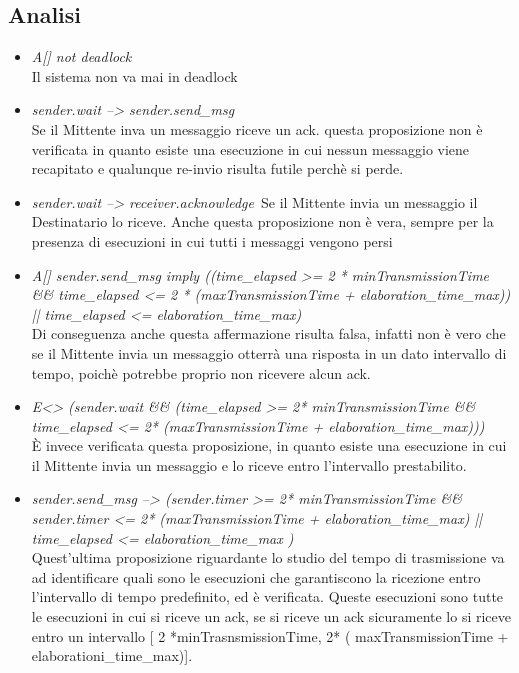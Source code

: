 \documentclass[a4paper]{article}
\begin{document}
\subsection{Analisi}
\begin{itemize}
	\item \textit{A[] not deadlock}\\
		Il sistema non va mai in deadlock
	\item \textit{sender.wait --> sender.send\_msg}\\
		Se il Mittente inva un messaggio riceve un ack. questa proposizione non è verificata in quanto esiste una esecuzione in cui nessun messaggio viene recapitato e qualunque re-invio risulta futile perchè si perde.
	\item \textit{sender.wait --> receiver.acknowledge}\
		Se il Mittente invia un messaggio il Destinatario lo riceve. Anche questa proposizione non è vera, sempre per la presenza di esecuzioni in cui tutti i messaggi vengono persi
	\item \textit{A[] sender.send\_msg imply ((time\_elapsed >= 2 * minTransmissionTime \&\& time\_elapsed <= 2 * (maxTransmissionTime + elaboration\_time\_max)) || time\_elapsed <= elaboration\_time\_max)}\\
		Di conseguenza anche questa affermazione risulta falsa, infatti non è vero che se il Mittente invia un messaggio otterrà una risposta in un dato intervallo di tempo, poichè potrebbe proprio non ricevere alcun ack.
	\item \textit{E<> (sender.wait \&\& (time\_elapsed >= 2* minTransmissionTime \&\& time\_elapsed <= 2* (maxTransmissionTime + elaboration\_time\_max)))}\\
		È invece verificata questa proposizione, in quanto esiste una esecuzione in cui il Mittente invia un messaggio e lo riceve entro l'intervallo prestabilito.
	\item \textit{sender.send\_msg --> (sender.timer >= 2* minTransmissionTime \&\& sender.timer <= 2* (maxTransmissionTime + elaboration\_time\_max) || time\_elapsed <= elaboration\_time\_max ) }\\
		Quest'ultima proposizione riguardante lo studio del tempo di trasmissione va ad identificare quali sono le esecuzioni che garantiscono la ricezione entro l'intervallo di tempo predefinito, ed è verificata.
		Queste esecuzioni sono tutte le esecuzioni in cui si riceve un ack, se si riceve un ack sicuramente lo si riceve entro un intervallo [ 2 *minTrasnsmissionTime, 2* ( maxTransmissionTime + elaborationi\_time\_max)].\\

\end{itemize}
\end{document}
